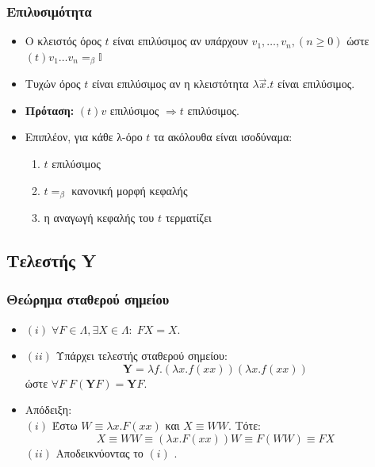 \documentclass{beamer}
\begin{document}
\begin{frame}
\frametitle{Επιλυσιμότητα}
\begin{itemize}
\item Ο κλειστός όρος $t$ είναι επιλύσιμος αν υπάρχουν $v_1, \ldots, v_n, (n \geqslant 0)$ ώστε
 $ (t) v_1 \ldots v_n =_\beta \mathbb{I} $ \pause
 \item Τυχών όρος $t$ είναι επιλύσιμος αν η κλειστότητα $\lambda \overrightarrow{x} . t$ είναι επιλύσιμος. \pause
 \item \textbf{Πρόταση:} $(t) v$ επιλύσιμος $ \Rightarrow t$ επιλύσιμος. \pause
 \item Επιπλέον, για κάθε λ-όρο $t$ τα ακόλουθα είναι ισοδύναμα:
 	\begin{enumerate}
 	\item $t$ επιλύσιμος
 	\item $t =_\beta$ κανονική μορφή κεφαλής
 	\item η αναγωγή κεφαλής του $t$ τερματίζει 	
 	\end{enumerate}
\end{itemize}
\end{frame}

\subsection{Τελεστής Y}

\begin{frame}
\frametitle{Θεώρημα σταθερού σημείου}
\begin{itemize}
\item $ (i) \; \forall F \in \Lambda , \exists X \in \Lambda: \; F X = X. $ \pause
\item $ (ii) $ Υπάρχει τελεστής σταθερού σημείου:
\[ \textbf{Y} = \lambda f . (\lambda x . f (xx)) (\lambda x . f (xx)) \]
ώστε $ \forall F \; F (\textbf{Y} F) = \textbf{Y} F $. \pause
\item Απόδειξη: \\
$ (i) $ Έστω $ W \equiv \lambda x . F (xx) $ και $ X \equiv W W $. Τότε:
\[ X \equiv W W \equiv (\lambda x . F (xx)) W \equiv F (WW) \equiv F X \] \pause
$ (ii) $ Αποδεικνύοντας το $ (i) $ .
\end{itemize}
\end{frame}
\end{document}
